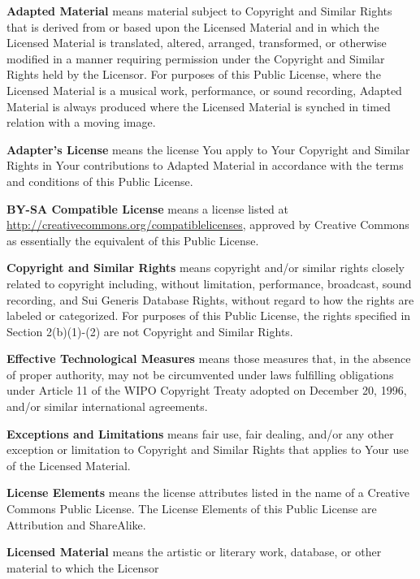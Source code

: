 	\begin{ccEnumerate}
		\item \textbf{Adapted Material} means material subject to Copyright and Similar Rights that is derived from or based upon 
			the Licensed Material and in which the Licensed Material is translated, altered, arranged, transformed, or 
			otherwise modified in a manner requiring permission under the Copyright and Similar Rights held by the Licensor. 
			For purposes of this Public License, where the Licensed Material is a musical work, performance, or sound recording, 
			Adapted Material is always produced where the Licensed Material is synched in timed relation with a moving image.
		\item \textbf{Adapter's License} means the license You apply to Your Copyright and Similar Rights in Your contributions to 
			Adapted Material in accordance with the terms and conditions of this Public License.
		\item \textbf{BY-SA Compatible License} means a license listed at  \url{http://creativecommons.org/compatiblelicenses}, approved by 
			Creative Commons as essentially the equivalent of this Public License.
		\item \textbf{Copyright and Similar Rights} means copyright and/or similar rights closely related to copyright including, 
			without limitation, performance, broadcast, sound recording, and Sui Generis Database Rights, without regard to 
			how the rights are labeled or categorized. For purposes of this Public License, the rights specified in 
			Section 2(b)(1)-(2) are not Copyright and Similar Rights.
		\item \textbf{Effective Technological Measures} means those measures that, in the absence of proper authority, may not
		      be circumvented under laws fulfilling obligations under Article 11 of the WIPO Copyright Treaty adopted on 
			December 20, 1996, and/or similar
		      international agreements.
		\item \textbf{Exceptions and Limitations} means fair use, fair dealing, and/or any other exception or limitation to 
			Copyright and Similar Rights that applies to Your use of the Licensed Material.
		\item \textbf{License Elements} means the license attributes listed in the name of a Creative Commons Public License. 
			The License Elements of this Public License are Attribution and ShareAlike.
		\item \textbf{Licensed Material} means the artistic or literary work, database, or other material to which the Licensor 

\end{ccEnumerate}
